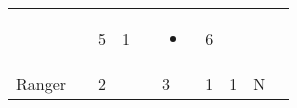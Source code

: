 \documentclass[12pt]{article}
\begin{document}
\begin{longtable}[]{@{}llllllllll@{}}
\begin{minipage}[t]{0.06\columnwidth}
\strut\end{minipage} &
\begin{minipage}[t]{0.06\columnwidth}\raggedright\strut
\strut\end{minipage} &
\begin{minipage}[t]{0.06\columnwidth}\raggedright\strut
5
\strut\end{minipage} &
\begin{minipage}[t]{0.06\columnwidth}\raggedright\strut
1
\strut\end{minipage} &
\begin{minipage}[t]{0.06\columnwidth}\raggedright\strut
\strut\end{minipage} &
\begin{minipage}[t]{0.07\columnwidth}\raggedright\strut
\begin{itemize}
\item
\end{itemize}
\strut\end{minipage} &
\begin{minipage}[t]{0.08\columnwidth}\raggedright\strut
6
\strut\end{minipage}\tabularnewline
\begin{minipage}[t]{0.13\columnwidth}\raggedright\strut
Ranger
\strut\end{minipage} &
\begin{minipage}[t]{0.06\columnwidth}\raggedright\strut
\strut\end{minipage} &
\begin{minipage}[t]{0.06\columnwidth}\raggedright\strut
2
\strut\end{minipage} &
\begin{minipage}[t]{0.06\columnwidth}\raggedright\strut
\strut\end{minipage} &
\begin{minipage}[t]{0.06\columnwidth}\raggedright\strut
\strut\end{minipage} &
\begin{minipage}[t]{0.06\columnwidth}\raggedright\strut
3
\strut\end{minipage} &
\begin{minipage}[t]{0.06\columnwidth}\raggedright\strut
1
\strut\end{minipage} &
\begin{minipage}[t]{0.06\columnwidth}\raggedright\strut
1
\strut\end{minipage} &
\begin{minipage}[t]{0.07\columnwidth}\raggedright\strut
N
\strut\end{minipage} &

\end{longtable}
\end{document}
